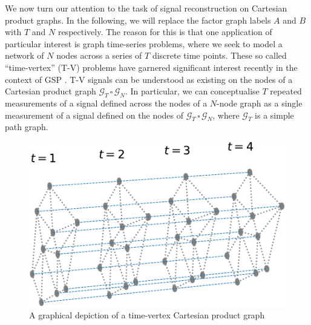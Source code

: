 \label{sec:gsr_cpg}

We now turn our attention to the task of signal reconstruction on Cartesian product graphs. In the following, we will replace the factor graph labels $A$ and $B$ with $T$ and $N$ respectively. The reason for this is that one application of particular interest is graph time-series problems, where we seek to model a network of $N$ nodes across a series of $T$ discrete time points. These so called ``time-vertex'' (T-V) problems have garnered significant interest recently in the context of GSP \citep{Grassi2018, Isufi2017, Loukas2016}. T-V signals can be understood as existing on the nodes of a Cartesian product graph $\mathcal{G}_T \, \square \, \mathcal{G}_N$. In particular, we can conceptualise $T$ repeated measurements of a signal defined across the nodes of a $N$-node graph as a single measurement of a signal defined on the nodes of $\mathcal{G}_T \, \square \, \mathcal{G}_N$, where $\mathcal{G}_T$ is a simple path graph.

\vspace{1cm}


\begin{figure}[t]
    \begin{center}
    \includegraphics[width=0.5\linewidth]{Figures/T-V.pdf}
    \end{center}
    \caption[A time-vertex Cartesian product graph]{A graphical depiction of a time-vertex Cartesian product graph}
    \label{fig:TV}
\end{figure}



